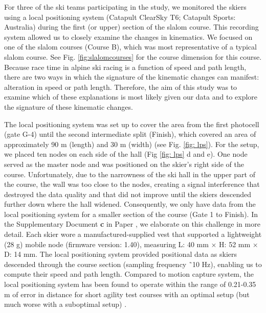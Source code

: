 For three of the ski teams participating in the study, we monitored the skiers using a local positioning system (Catapult ClearSky T6; Catapult Sports: Australia) during the first (or upper) section of the slalom course. This recording system allowed us to closely examine the changes in kinematics. We focused on one of the slalom courses (Course B), which was most representative of a typical slalom course. See Fig. \ref{fig:slalomcourses} for the course dimension for this course. Because race time in alpine ski racing is a function of speed and path length, there are two ways in which the signature of the kinematic changes can manifest: alteration in speed or path length. Therefore, the aim of this study was to examine which of these explanations is most likely given our data and to explore the signature of these kinematic changes.

The local positioning system was set up to cover the area from the first photocell (gate G-4) until the second intermediate split (Finish), which covered an area of approximately 90 m (length) and 30 m (width) (see Fig. \ref{fig: lps}). For the setup, we placed ten nodes on each side of the hall (Fig \ref{fig: lps} d and e). One node served as the master node and was positioned on the skier’s right side of the course. Unfortunately, due to the narrowness of the ski hall in the upper part of the course, the wall was too close to the nodes, creating a signal interference that destroyed the data quality and that did not improve until the skiers descended further down where the hall widened. Consequently, we only have data from the local positioning system for a smaller section of the course (Gate 1 to Finish). In the Supplementary Document \textbf{c} in Paper , we elaborate on this challenge in more detail. Each skier wore a manufactured-supplied vest that supported a lightweight (28 g) mobile node (firmware version: 1.40), measuring L: 40 mm × H: 52 mm × D: 14 mm. The local positioning system provided positional data as skiers descended through the course section (sampling frequency ˜10 Hz), enabling us to compute their speed and path length. Compared to motion capture system, the local positioning system has been found to operate within the range of 0.21-0.35 m of error in distance for short agility test courses with an optimal setup (but much worse with a suboptimal setup) \cite{luteberget_validity_2018}. 


